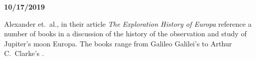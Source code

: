 
{\bf 10/17/2019}

Alexander et.\ al., in their article {\it The Exploration History of
Europa}\cite{Alexander2009} reference a number of books in a
discussion of the history of the observation and study of Jupiter's
moon Europa.  The books range from Galileo Galilei's \cite{Galilei1989} to Arthur C.\ Clarke's \cite{Clarke1982}.

